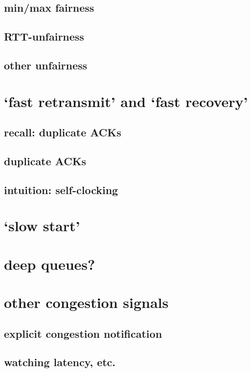 \subsection{min/max fairness}


\subsection{RTT-unfairness}


\subsection{other unfairness}


\section{`fast retransmit' and `fast recovery'}

\subsection{recall: duplicate ACKs}


\subsection{duplicate ACKs}

\subsection{intuition: self-clocking}


\section{`slow start'}


\section{deep queues?}



\section{other congestion signals}



\subsection{explicit congestion notification}



\subsection{watching latency, etc.}




